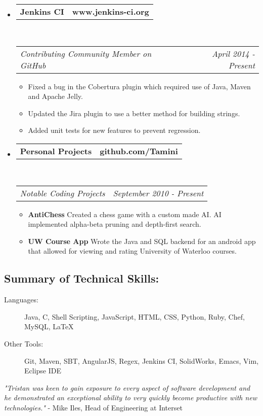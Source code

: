 \documentclass[11pt]{article} %
\makeatletter
\newcommand{\CPP}
{C\nolinebreak[4]\hspace{-.05em}\raisebox{.22ex}{\footnotesize\bf ++}}
\newcommand{\headerrow}[2]
{\begin{tabular*}{\linewidth}{l@{\extracolsep{\fill}}r}
	#1 &
	#2 \\
\end{tabular*}}
\makeatother
\begin{document}
\begin{itemize}[leftmargin=-0.5em, label={}]
	\item
	\headerrow
		{\textbf{Jenkins CI}}
		{\textbf{www.jenkins-ci.org}}
	\\
	\headerrow
		{\emph{Contributing Community Member on GitHub}}
		{\emph{April 2014 - Present}}
	\begin{itemize}
		\item Fixed a bug in the Cobertura plugin which required use of Java, Maven and Apache Jelly.
		\item Updated the Jira plugin to use a better method for building strings.
		\item Added unit tests for new features to prevent regression. 
	\end{itemize}

	\item
	\headerrow
		{\textbf{Personal Projects}}
		{\textbf{github.com/Tamini}}
	\\
	\headerrow
		{\emph{Notable Coding Projects}}
		{\emph{September 2010 - Present}}
	\begin{itemize}
		\item {\bf AntiChess} Created a chess game with a custom made AI. AI implemented alpha-beta pruning and depth-first search.
		\item {\bf UW Course App} Wrote the Java and SQL backend for an android app that allowed for viewing and rating University of Waterloo courses.
	\end{itemize}

\end{itemize}
\subsection*{Summary of Technical Skills:}
\begin{description}
	\item[Languages:] Java, \CPP, Shell Scripting, JavaScript, HTML, CSS, Python, Ruby, Chef, MySQL, \LaTeX\
	\item[Other Tools:] Git, Maven, SBT, AngularJS, Regex, Jenkins CI, SolidWorks, Emacs, Vim, Eclipse IDE
\end{description}
\begin{center}

\textit{\newline "Tristan was keen to gain exposure to every aspect of software development and he demonstrated an exceptional ability to very quickly become productive with new technologies." \newline
}
- Mike Iles, Head of Engineering at Interset
\end{center}
\end{document}
